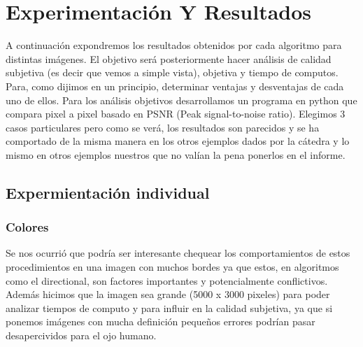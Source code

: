 \section{Experimentación Y Resultados}

A continuación expondremos los resultados obtenidos por cada algoritmo para distintas imágenes. El objetivo será posteriormente hacer análisis de calidad subjetiva (es decir que vemos a simple vista), objetiva y tiempo de computos. Para, como dijimos en un principio, determinar ventajas y desventajas de cada uno de ellos. Para los análisis objetivos desarrollamos un programa en python que compara pixel a pixel basado en PSNR (Peak signal-to-noise ratio). Elegimos 3 casos particulares pero como se verá, los resultados son parecidos y se ha comportado de la misma manera en los otros ejemplos dados por la cátedra y lo mismo en otros ejemplos nuestros que no valían la pena ponerlos en el informe.

\subsection{Expermientación individual}

\subsubsection{Colores}


Se nos ocurrió que podría ser interesante chequear los comportamientos de estos procedimientos en una imagen con muchos bordes ya que estos, en algoritmos como el directional, son factores importantes y potencialmente conflictivos. Además hicimos que la imagen sea grande (5000 x 3000 pixeles) para poder analizar tiempos de computo y para influir en la calidad subjetiva, ya que si ponemos imágenes con mucha definición pequeños errores podrían pasar desapercividos para el ojo humano.

